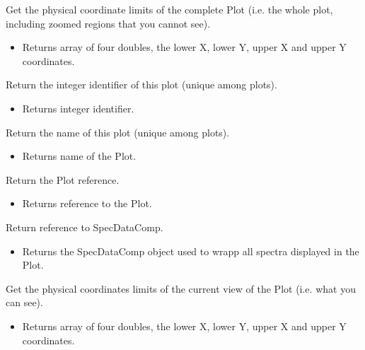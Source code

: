 \begin{desc}Get the physical coordinate limits of the complete Plot
 (i.e. the whole plot, including zoomed regions that you cannot
 see).
\begin{itemize}
\item{Returns array of four doubles, the lower X, lower Y, upper X
         and upper Y coordinates. }
\end{itemize}
\end{desc}

\begin{desc}Return the integer identifier of this plot (unique among plots).
\begin{itemize}
\item{Returns integer identifier. }
\end{itemize}
\end{desc}

\begin{desc}Return the name of this plot (unique among plots).
\begin{itemize}
\item{Returns name of the Plot. }
\end{itemize}
\end{desc}

\begin{desc}Return the Plot reference.
\begin{itemize}
\item{Returns reference to the Plot. }
\end{itemize}
\end{desc}

\begin{desc}Return reference to SpecDataComp.
\begin{itemize}
\item{Returns the SpecDataComp object used to wrapp all spectra
         displayed in the Plot. }
\end{itemize}
\end{desc}

\begin{desc}Get the physical coordinates limits of the current view of the
 Plot (i.e. what you can see).
\begin{itemize}
\item{Returns array of four doubles, the lower X, lower Y, upper X
         and upper Y coordinates. }
\end{itemize}
\end{desc}

